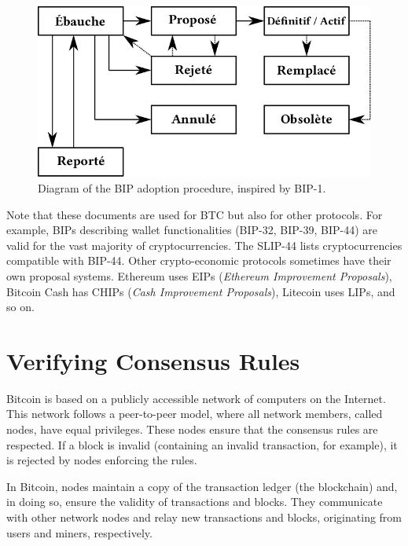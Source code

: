 \documentclass[
  a5paper,
  smalldemyvopaper,10pt,twoside,onecolumn,openright,extrafontsizes,hidelinks]{memoir}
\begin{document}
\begin{figure}[H]

{\centering \includegraphics{chapters/img/bip-process-fr.png}

}

\caption{Diagram of the BIP adoption procedure, inspired by BIP-1.}

\end{figure}%

Note that these documents are used for BTC but also for other protocols.
For example, BIPs describing wallet functionalities (BIP-32, BIP-39,
BIP-44) are valid for the vast majority of cryptocurrencies. The SLIP-44
lists cryptocurrencies compatible with BIP-44. Other crypto-economic
protocols sometimes have their own proposal systems. Ethereum uses EIPs
(\emph{Ethereum Improvement Proposals}), Bitcoin Cash has CHIPs
(\emph{Cash Improvement Proposals}), Litecoin uses LIPs, and so on.

\section*{Verifying Consensus Rules}\label{verifying-consensus-rules}


Bitcoin is based on a publicly accessible network of computers on the
Internet. This network follows a peer-to-peer model, where all network
members, called nodes, have equal privileges. These nodes ensure that
the consensus rules are respected. If a block is invalid (containing an
invalid transaction, for example), it is rejected by nodes enforcing the
rules.

In Bitcoin, nodes maintain a copy of the transaction ledger (the
blockchain) and, in doing so, ensure the validity of transactions and
blocks. They communicate with other network nodes and relay new
transactions and blocks, originating from users and miners,
respectively.
\end{document}
